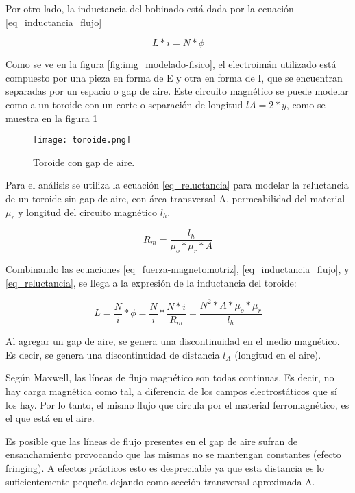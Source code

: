 \noindent Por otro lado, la inductancia del bobinado está dada por la ecuación \ref{eq_inductancia_flujo}

\begin{equation} \label{eq_inductancia_flujo}
	L*i=N*\phi
\end{equation}


\noindent Como se ve en la figura \ref{fig:img_modelado-fisico}, el electroimán utilizado está compuesto por una pieza en forma de E y otra en forma de I, que se encuentran separadas por un espacio o gap de aire. Este circuito magnético se puede modelar como a un toroide con un corte o separación  de longitud $lA=2*y$, como se muestra en la figura \ref{fig:img_toroide}

\begin{figure}[H]
	\centering
	\texttt{[image: toroide.png]}
	\caption{Toroide con gap de aire.}
	\label{fig:img_toroide}
\end{figure}

\noindent Para el análisis se utiliza la ecuación \ref{eq_reluctancia} para modelar la reluctancia de un toroide sin gap de aire, con área transversal A, permeabilidad del material $\mu_{r}$ y longitud del circuito magnético $l_{h}$. 

\begin{equation}\label{eq_reluctancia}
	R_{m}=\frac{l_{h}}{\mu_{o}*\mu_{r}*A}
\end{equation}

\noindent Combinando las ecuaciones \ref{eq_fuerza-magnetomotriz}, \ref{eq_inductancia_flujo}, y \ref{eq_reluctancia}, se llega a la expresión de la inductancia del toroide:

\begin{equation}\label{eq_inductancia}
	L=\frac{N}{i}*\phi=\frac{N}{i}*\frac{N*i}{R_{m}}=\frac{N^	{2}*A*\mu_{o}*\mu_{r}}{l_{h}}
\end{equation}


\noindent Al agregar un gap de aire, se genera una discontinuidad en el medio magnético. Es decir, se genera una discontinuidad de distancia $l_{A}$ (longitud en el aire).

\noindent Según Maxwell, las líneas de flujo magnético son todas continuas. Es decir, no hay carga magnética como tal, a diferencia de los campos electrostáticos que sí los hay. Por lo tanto, el mismo flujo que circula por el material ferromagnético, es el que  está en el aire. 

\noindent Es posible que las líneas de flujo presentes en el gap de aire sufran de ensanchamiento provocando que las mismas no se mantengan constantes (efecto fringing). A efectos prácticos esto es despreciable ya que esta distancia es lo suficientemente pequeña dejando como sección transversal aproximada A.

